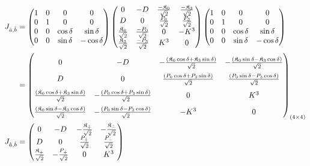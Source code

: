 \documentclass[]{article}
\numberwithin{equation}{section}
\begin{document}
{{\begin{align}
    J_{\hat{a},\hat{b}}&=\begin{pmatrix}
    1&0&0&0\\
    0&1&0&0\\
    0&0&\cos{\delta}&\sin{\delta}\\
    0&0&\sin{\delta}&-\cos{\delta}
    \end{pmatrix}\begin{pmatrix}
  0&-D&\frac{-\mathfrak{K}_0}{\sqrt{2}}&\frac{-\mathfrak{K}_3}{\sqrt{2}}\\
  D&0&\frac{P_0}{\sqrt{2}}&\frac{P_3}{\sqrt{2}}\\
    \frac{\mathfrak{K}_0}{\sqrt{2}}&\frac{-P_0}{\sqrt{2}}&0  & -K^{3}\\
    \frac{\mathfrak{K}_3}{\sqrt{2}}&\frac{-P_3}{\sqrt{2}}&K^{3} & 0
  \end{pmatrix} \begin{pmatrix}
    1&0&0&0\\
    0&1&0&0\\
    0&0&\cos{\delta}&\sin{\delta}\\
    0&0&\sin{\delta}&-\cos{\delta}
    \end{pmatrix}\\
    &=\begin{pmatrix}
    \rule{0pt}{16pt} 0&-D&-\frac{(\mathfrak{K}_0\cos{\delta}+\mathfrak{K}_3\sin{\delta})}{\sqrt{2}}&-\frac{(\mathfrak{K}_0\sin{\delta}-\mathfrak{K}_3\cos{\delta})}{\sqrt{2}}\\
    \rule{0pt}{16pt} D&0&\frac{(P_0\cos{\delta}+P_3\sin{\delta})}{\sqrt{2}}&\frac{(P_0\sin{\delta}-P_3\cos{\delta})}{\sqrt{2}}\\
    \rule{0pt}{16pt} \frac{(\mathfrak{K}_0\cos{\delta}+\mathfrak{K}_3\sin{\delta})}{\sqrt{2}}&-\frac{(P_0\cos{\delta}+P_3\sin{\delta})}{\sqrt{2}}&0 & {K}^{3}\\
    \rule{0pt}{16pt} \frac{(\mathfrak{K}_0\sin{\delta}-\mathfrak{K}_3\cos{\delta})}{\sqrt{2}}&-\frac{(P_0\sin{\delta}-P_3\cos{\delta})}{\sqrt{2}}&-{K}^{3}  & 0
  \end{pmatrix}_{(4\times4)}\\
    J_{\hat{a},\hat{b}}&=\begin{pmatrix}
    0&-D&-\frac{\mathfrak{K}_{\hat{+}}}{\sqrt{2}}&-\frac{\mathfrak{K}_{\hat{-}}}{\sqrt{2}}\\
    D&0&\frac{P_{\hat{+}}}{\sqrt{2}}&\frac{P_{\hat{-}}}{\sqrt{2}}\\
    \frac{\mathfrak{K}_{\hat{+}}}{\sqrt{2}}&-\frac{P_{\hat{+}}}{\sqrt{2}}&0 & {K}^{3}\\

\end{pmatrix}
\end{align}}}
\end{document}
